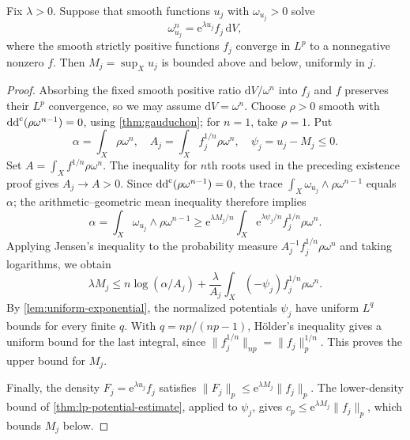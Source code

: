 \begin{lemma}\label{lem:exponential-gauduchon-mean}
Fix $\lambda>0$. Suppose that smooth functions $u_j$ with $\omega_{u_j}>0$ solve
\[
 \omega_{u_j}^n=\mathrm{e}^{\lambda u_j}f_j\,\mathrm{d}V,
\]
where the smooth strictly positive functions $f_j$ converge in $L^p$ to a nonnegative nonzero $f$. Then $M_j=\sup_Xu_j$ is bounded above and below, uniformly in $j$.
\end{lemma}
\begin{proof}
Absorbing the fixed smooth positive ratio $\mathrm{d}V/\omega^n$ into $f_j$ and $f$ preserves their $L^p$ convergence, so we may assume $\mathrm{d}V=\omega^n$. Choose $\rho>0$ smooth with $\mathrm{dd}^{\mathrm{c}}(\rho\omega^{n-1})=0$, using \cref{thm:gauduchon}; for $n=1$, take $\rho=1$. Put
\[
 \alpha=\int_X\rho\omega^n,\quad
 A_j=\int_X f_j^{1/n}\rho\omega^n,\quad
 \psi_j=u_j-M_j\leq0.
\]
Set $A=\int_X f^{1/n}\rho\omega^n$. The inequality for $n$th roots used in the preceding existence proof gives $A_j\to A>0$. Since $\mathrm{dd}^{\mathrm{c}}(\rho\omega^{n-1})=0$, the trace $\int_X\omega_{u_j}\wedge\rho\omega^{n-1}$ equals $\alpha$; the arithmetic--geometric mean inequality therefore implies
\[
 \alpha=\int_X\omega_{u_j}\wedge\rho\omega^{n-1}
 \geq \mathrm{e}^{\lambda M_j/n}\int_X \mathrm{e}^{\lambda\psi_j/n}f_j^{1/n}\rho\omega^n.
\]
Applying Jensen's inequality to the probability measure
$A_j^{-1}f_j^{1/n}\rho\omega^n$ and taking logarithms, we obtain
\begin{equation}\label{eq:gauduchon-exponential-mean}
 \lambda M_j\leq n\log(\alpha/A_j)
 +\frac{\lambda}{A_j}\int_X(-\psi_j)f_j^{1/n}\rho\omega^n.
\end{equation}
By \cref{lem:uniform-exponential}, the normalized potentials $\psi_j$ have uniform $L^q$ bounds for every finite $q$. With $q=np/(np-1)$, H\"older's inequality gives a uniform bound for the last integral, since
$\|f_j^{1/n}\|_{np}=\|f_j\|_p^{1/n}$. This proves the upper bound for $M_j$.

Finally, the density $F_j=\mathrm{e}^{\lambda u_j}f_j$ satisfies
$\|F_j\|_p\leq \mathrm{e}^{\lambda M_j}\|f_j\|_p$. The lower-density bound of \cref{thm:lp-potential-estimate}, applied to $\psi_j$, gives $c_p\leq \mathrm{e}^{\lambda M_j}\|f_j\|_p$, which bounds $M_j$ below.
\end{proof}

